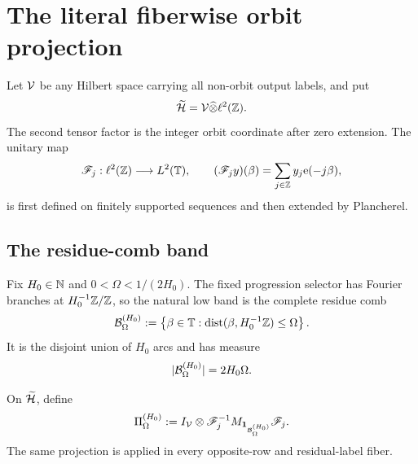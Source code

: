 \section{The literal fiberwise orbit projection}
\label{sec:tpc47-projector}

Let \(\mathcal V\) be any Hilbert space carrying all non-orbit output labels,
and put
\begin{equation}
 \widetilde{\mathcal H}=\mathcal V\widehat\otimes\ell^2(\mathbb Z).
 \label{eq:tpc47-abstract-output-space}
\end{equation}
The second tensor factor is the integer orbit coordinate after zero
extension.  The unitary map
\begin{equation}
 \mathscr F_j:\ell^2(\mathbb Z)\longrightarrow L^2(\mathbb T),
 \qquad
 (\mathscr F_jy)(\beta)=\sum_{j\in\mathbb Z}y_j\mathrm e(-j\beta),
 \label{eq:tpc47-orbit-Fourier-transform}
\end{equation}
is first defined on finitely supported sequences and then extended by
Plancherel.

\subsection{The residue-comb band}

Fix \(H_0\in\mathbb N\) and \(0<\Omega<1/(2H_0)\).  The fixed progression
selector has Fourier branches at \(H_0^{-1}\mathbb Z/\mathbb Z\), so the natural
low band is the complete residue comb
\begin{equation}
 \mathcal B_{\Omega}^{(H_0)}
 :=\left\{\beta\in\mathbb T:
 \operatorname{dist}(\beta,H_0^{-1}\mathbb Z)\le\Omega\right\}.
 \label{eq:tpc47-frequency-comb}
\end{equation}
It is the disjoint union of \(H_0\) arcs and has measure
\begin{equation}
 |\mathcal B_{\Omega}^{(H_0)}|=2H_0\Omega.
 \label{eq:tpc47-comb-measure}
\end{equation}

\begin{definition}
\label{def:tpc47-orbit-projector}
On \(\widetilde{\mathcal H}\), define
\begin{equation}
 \Pi_{\Omega}^{(H_0)}
 :=I_{\mathcal V}\otimes
 \mathscr F_j^{-1}M_{\mathbf 1_{\mathcal B_{\Omega}^{(H_0)}}}\mathscr F_j.
 \label{eq:tpc47-projector-definition}
\end{equation}
The same projection is applied in every opposite-row and residual-label
fiber.
\end{definition}

